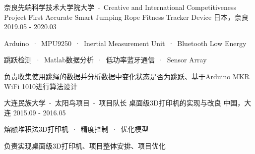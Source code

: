 

\begin{cventries}
  
  \cventryproject 
    {奈良先端科学技术大学院大学\ -\ Creative and International Competitiveness Project}%
    {First Accurate Smart Jumping Rope Fitness Tracker Device} %
    {日本，奈良} %
    {2019.05 - 2020.03} %
    {
      \begin{cvitems} %
        \item {Arduino\ ·\ MPU9250\ ·\ Inertial Measurement Unit\ ·\ Bluetooth Low Energy}
        \item {跳跃检测\ ·\ Matlab数据分析\ ·\ 低功率蓝牙通信\ ·\ Sensor Array}
        \item {负责收集使用跳绳的数据并分析数据中变化状态是否为跳跃、基于Arduino MKR WiFi 1010进行算法设计}
      \end{cvitems}
    }
    
  \cventryproject 
    {大连民族大学\ -\ 太阳鸟项目\ -\ 项目队长}%
    {桌面级3D打印机的实现与改良} %
    {中国，大连} %
    {2015.09 - 2016.05} %
    {
      \begin{cvitems} %
        \item {熔融堆积法3D打印机\ ·\ 精度控制\ ·\ 优化模型}
        \item {负责实现桌面级3D打印机、项目整体安排、项目优化}
      \end{cvitems}
    }

\end{cventries}